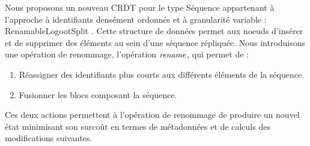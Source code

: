 Nous proposons un nouveau \ac{CRDT} pour le type Séquence appartenant à l'approche à identifiants densément ordonnés et à granularité variable : RenamableLogootSplit \cite{2020-rls-papoc-nicolas,2022-rls-tpds-nicolas}.
Cette structure de données permet aux noeuds d'insérer et de supprimer des éléments au sein d'une séquence répliquée.
Nous introduisons une opération de renommage, l'opération $\mathit{rename}$, qui permet de :
\begin{enumerate}
  \item Réassigner des identifiants plus courts aux différents éléments de la séquence.
  \item Fusionner les blocs composant la séquence.
\end{enumerate}
Ces deux actions permettent à l'opération de renommage de produire un nouvel état minimisant son surcoût en termes de métadonnées et de calculs des modifications suivantes.

